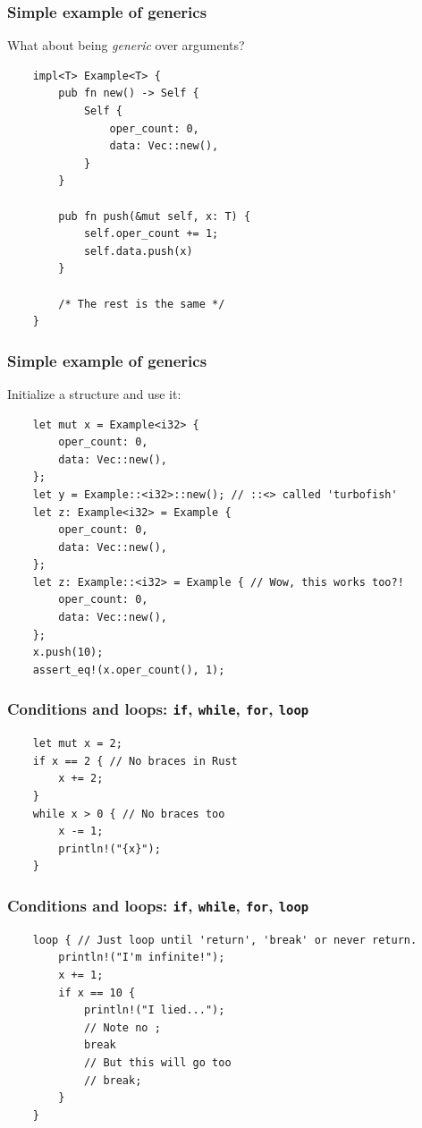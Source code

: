 \documentclass[aspectratio=1610,t]{beamer}
\begin{document}

\begin{frame}[fragile]
\frametitle{Simple example of generics}
What about being \textit{generic} over arguments?

\begin{verbatim}
    impl<T> Example<T> {
        pub fn new() -> Self {
            Self {
                oper_count: 0,
                data: Vec::new(),
            }
        }

        pub fn push(&mut self, x: T) {
            self.oper_count += 1;
            self.data.push(x)
        }

        /* The rest is the same */
    } 
\end{verbatim}
\end{frame}


\begin{frame}[fragile]
\frametitle{Simple example of generics}
Initialize a structure and use it:

\begin{verbatim}
    let mut x = Example<i32> {
        oper_count: 0,
        data: Vec::new(),
    };
    let y = Example::<i32>::new(); // ::<> called 'turbofish'
    let z: Example<i32> = Example {
        oper_count: 0,
        data: Vec::new(),
    };
    let z: Example::<i32> = Example { // Wow, this works too?!
        oper_count: 0,
        data: Vec::new(),
    };
    x.push(10);
    assert_eq!(x.oper_count(), 1);
\end{verbatim}
\end{frame}


\begin{frame}[fragile]
\frametitle{Conditions and loops: \texttt{if}, \texttt{while}, \texttt{for}, \texttt{loop}}
\begin{verbatim}
    let mut x = 2;
    if x == 2 { // No braces in Rust
        x += 2;
    }
    while x > 0 { // No braces too
        x -= 1;
        println!("{x}");
    }
\end{verbatim}
\end{frame}


\begin{frame}[fragile]
\frametitle{Conditions and loops: \texttt{if}, \texttt{while}, \texttt{for}, \texttt{loop}}
\begin{verbatim}
    loop { // Just loop until 'return', 'break' or never return.
        println!("I'm infinite!");
        x += 1;
        if x == 10 {
            println!("I lied...");
            // Note no ;
            break
            // But this will go too
            // break;
        }
    }
\end{verbatim}
\end{frame}
\end{document}

